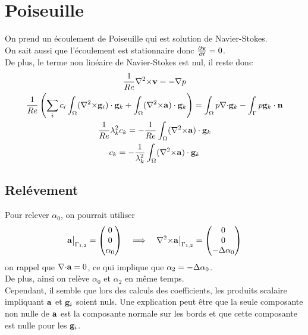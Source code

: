 \documentclass[a4paper,11pt]{article}
\begin{document}
\section{Poiseuille}
On prend un écoulement de Poiseuille qui est solution de Navier-Stokes.\\
On sait aussi que l'écoulement est stationnaire donc $\frac{\partial{\mathbf{v}}}{\partial t}=0$.\\
De plus, le terme non linéaire de Navier-Stokes est nul, il reste donc
\begin{gather}
  \frac{1}{Re}{\nabla^2\times}{\mathbf{v}}=-{\nabla} p\\
  \frac{1}{Re}\left( \sum_i c_i\int_\Omega ({\nabla^2\times}{\mathbf{g}}_i)\cdot{\mathbf{g}}_k + \int_\Omega ({\nabla^2\times}{\mathbf{a}})\cdot{\mathbf{g}}_k \right) = \int_\Omega p{\nabla\cdot}{\mathbf{g}}_k - \int_\Gamma p{\mathbf{g}}_k\cdot{\mathbf{n}}\\
  \frac{1}{Re}\lambda_k^2 c_k = -\frac{1}{Re}\int_\Omega ({\nabla^2\times}{\mathbf{a}})\cdot{\mathbf{g}}_k\\
  c_k = -\frac{1}{\lambda_k^2}\int_\Omega ({\nabla^2\times}{\mathbf{a}})\cdot{\mathbf{g}}_k
\end{gather}

\subsection{Relévement}
\label{relev}
Pour relever $\alpha_0$, on pourrait utiliser
\begin{equation*}
  {\mathbf{a}}{\big\rvert_{\Gamma_{1,2}}}= \begin{pmatrix}
    0\\0\\\alpha_0
  \end{pmatrix}
  \quad\Longrightarrow\quad
  {\nabla^2\times}{\mathbf{a}}{\big\rvert_{\Gamma_{1,2}}}= \begin{pmatrix}
    0\\0\\-{\Delta}\alpha_0
  \end{pmatrix}
\end{equation*}
on rappel que ${\nabla\cdot}{\mathbf{a}}=0$, ce qui implique que $\alpha_2=-{\Delta}\alpha_0$.\\
De plus, ainsi on relève $\alpha_0$ et $\alpha_2$ en même temps.\\

Cependant, il semble que lors des calculs des coefficients, les produits scalaire impliquant ${\mathbf{a}}$ et ${\mathbf{g}}_i$ soient nuls. Une explication peut être que la seule composante non nulle de ${\mathbf{a}}$ est la composante normale sur les bords et que cette composante est nulle pour les ${\mathbf{g}}_i$.\\
\end{document}
